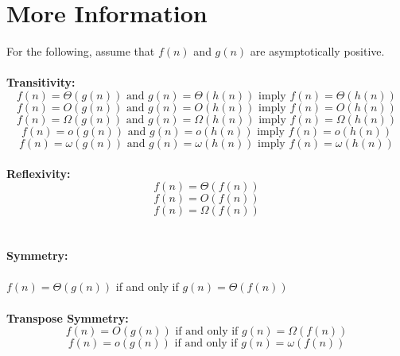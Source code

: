 \documentclass[12pt]{article}
\begin{document}
\newpage
\section*{More Information}
For the following, assume that $f(n)$ and $g(n)$ are asymptotically positive.
\\ \\
\textbf{Transitivity:}\\
\begin{equation*}
f(n) = \Theta{(g(n))} \text{ and } g(n) = \Theta{(h(n))} \text{ imply } f(n) = \Theta{(h(n))}
\end{equation*}
\begin{equation*}
f(n) = O{(g(n))} \text{ and } g(n) = O{(h(n))} \text{ imply } f(n) = O{(h(n))}
\end{equation*}
\begin{equation*}
f(n) = \Omega{(g(n))} \text{ and } g(n) = \Omega{(h(n))} \text{ imply } f(n) = \Omega{(h(n))}
\end{equation*}
\begin{equation*}
f(n) = o{(g(n))} \text{ and } g(n) = o{(h(n))} \text{ imply } f(n) = o{(h(n))}
\end{equation*}
\begin{equation*}
f(n) = \omega{(g(n))} \text{ and } g(n) = \omega{(h(n))} \text{ imply } f(n) = \omega{(h(n))}
\end{equation*}
\\
\textbf{Reflexivity:}\\
\begin{equation*}
f(n) = \Theta{(f(n))}
\end{equation*}
\begin{equation*}
f(n) = O{(f(n))}
\end{equation*}
\begin{equation*}
f(n) = \Omega{(f(n))}
\end{equation*}
\\ \\
\textbf{Symmetry:}
\\ \\
$f(n) = \Theta{(g(n))}$ if and only if $g(n) = \Theta{(f(n))}$
\\ \\
\textbf{Transpose Symmetry:}\\
\begin{equation*}
f(n) = O{(g(n))} \text{ if and only if } g(n) = \Omega{(f(n))}
\end{equation*}
\begin{equation*}
f(n) = o{(g(n))} \text{ if and only if } g(n) = \omega{(f(n))}
\end{equation*}
\end{document}
